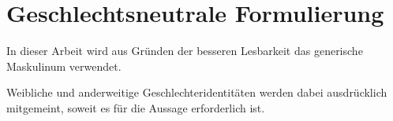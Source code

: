 \chapter*{Geschlechtsneutrale Formulierung}

 

In dieser Arbeit wird aus Gründen der besseren Lesbarkeit das generische Maskulinum verwendet.

Weibliche und anderweitige Geschlechteridentitäten werden dabei ausdrücklich mitgemeint, soweit es für die Aussage erforderlich ist.